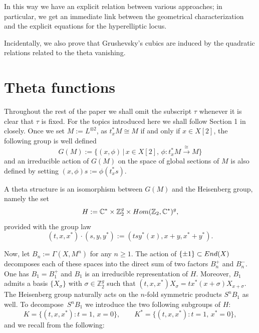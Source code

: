 \documentclass[11pt]{article}
\numberwithin{equation}{section}
\numberwithin{equation}{section}
\newcommand{\CC}{{\mathbb{C}}}
\newcommand{\ZZ}{{\mathbb{Z}}}
\def\ZZ{{\mathbb Z}}
\def\s{\sigma}
\begin{document}
In this way we have an explicit relation between various approaches; in particular, we get an immediate link between the geometrical characterization and the explicit equations for the hyperelliptic locus.

Incidentally, we also prove that Grushevsky's cubics are induced by the quadratic relations related to the theta vanishing.

\section{Theta functions}

Throughout the rest of the paper we shall omit the subscript $\tau$ whenever it is clear that $\tau$ is fixed.
For the topics introduced here we shall follow Section 1 in \cite{vG} closely. Once we set $ M:= L^{\otimes 2}$, as $t_{x}^*M\cong M$ if and only if $x \in X[2]$, the following group is well defined
\[
G(M):=\big\{(x, \phi) \,|\, x\in X[2], \, \phi\colon t_{x}^*M \xrightarrow{\cong} M \big\}
\]
and an irreducible action of $G(M)$ on the space of global sections of $M$ is also defined by setting $(x, \phi) s := \phi (t_{x}^*s)$.

A theta structure is an isomorphism between $G(M)$
and the Heisenberg group, namely the set
\[
H:=\CC^{*}\times\ZZ_{2}^g\times {\rm Hom}(\ZZ_{2}, \CC^{*})^g,
\]
provided with the group law
\[
(t,x,x^*) \cdot (s,y,y^*) :=(tsy^*(x), x+y, x^*+y^*).
\]

Now, let $B_n:=\Gamma(X, M^n)$ for any $n \geq 1$.
The action of $\{ \pm 1 \}\subset {\rm End}( X)$ decomposes each of these spaces into the direct sum of two factors $B_n ^{+}$ and $ B_n ^-$. One has $B_1= B_1^+$ and $B_1$ is an irreducible representation of $H$.
Moreover, $B_1$ admits a basis $\{X_{\s}\}$ with $\s\in\ZZ_2^g$ such that
$(t, x, x^*)X_{\s}=tx^*(x+\s)X_{x+\s}$. The Heisenberg group naturally acts on the $n$-fold symmetric products $S^nB_1$ as well. To decompose~$S^nB_1$ we introduce the two following subgroups of $H$:
\[
K=\{(t, x, x^*)\colon t=1,\, x=0\} , \qquad K^*=\{(t, x, x^*)\colon t=1,\, x^*=0\},
\]
and we recall from \cite{vG} the following:
\end{document}
